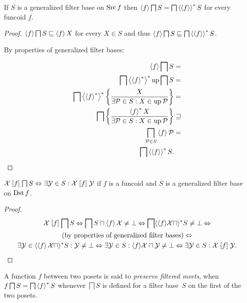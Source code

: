 \begin{thm}
\label{supfun-genbase}If $S$ is a generalized filter base on $\operatorname{Src} f$
then $\left\langle f\right\rangle\bigsqcap S=\bigsqcap\left\langle \left\langle f\right\rangle\right\rangle ^{\ast}S$ for every
funcoid $f$.\end{thm}
\begin{proof}
$\left\langle f\right\rangle\bigsqcap S\sqsubseteq\left\langle f\right\rangle X$ for every $X\in S$ and
thus $\left\langle f\right\rangle\bigsqcap S\sqsubseteq\bigsqcap\left\langle \left\langle f\right\rangle\right\rangle ^{\ast}S$.

By properties of generalized filter bases:

\begin{align*}
\left\langle f\right\rangle\bigsqcap S & =\\
\bigsqcap\left\langle \left\langle f\right\rangle ^{\ast}\right\rangle ^{\ast}\operatorname{up}\bigsqcap S & =\\
\bigsqcap\left\langle \left\langle f\right\rangle ^{\ast}\right\rangle ^{\ast}\left\{ \frac{X}{\exists\mathcal{P}\in
S:X\in\operatorname{up}\mathcal{P}}\right\} & =\\
\bigsqcap\left\{ \frac{\left\langle f\right\rangle ^{\ast}X}{\exists\mathcal{P}\in S:X\in\operatorname{up}\mathcal{P}}\right\} &
\sqsupseteq\\
\bigsqcap_{\mathcal{P}\in S}\left\langle f\right\rangle\mathcal{P} & =\\
\bigsqcap\left\langle \left\langle f\right\rangle\right\rangle ^{\ast}S.
\end{align*}
\end{proof}
\begin{prop}
$\mathcal{X}\mathrel{\left[f\right]}\bigsqcap S\Leftrightarrow\exists\mathcal{Y}\in
S:\mathcal{X}\mathrel{\left[f\right]}\mathcal{Y}$
if $f$ is a funcoid and $S$ is a generalized filter base on $\operatorname{Dst} f$.\end{prop}
\begin{proof}
~
\begin{multline*}
\mathcal{X}\mathrel{\left[f\right]}\bigsqcap S\Leftrightarrow\bigsqcap S\sqcap\left\langle f\right\rangle\mathcal{X}\neq\bot\Leftrightarrow\bigsqcap\langle\langle
f\rangle\mathcal{X}\sqcap\rangle^{\ast}S\neq\bot\Leftrightarrow\\
\text{(by properties of generalized filter bases)}\Leftrightarrow\\
\exists\mathcal{Y}\in\langle\left\langle f\right\rangle\mathcal{X}\sqcap\rangle^{\ast}S:\mathcal{Y}
\neq\bot\Leftrightarrow\exists\mathcal{Y}\in S:\langle
f\rangle\mathcal{X}\sqcap\mathcal{Y}\neq\bot\Leftrightarrow\exists\mathcal{Y}\in
S:\mathcal{X}\mathrel{\left[f\right]}\mathcal{Y}.
\end{multline*}
\end{proof}
\begin{defn}
A function $f$ between two posets is said to \emph{preserve filtered meets}, when $f\bigsqcap S=\bigsqcap\left\langle f\right\rangle ^{\ast}S$
whenever $\bigsqcap S$ is defined for a filter base~$S$ on the first of the two posets.
\end{defn}
